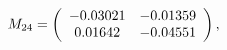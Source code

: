 \begin{equation}
M_{24}=
\left(
\begin{array}{c c}
-0.03021&
-0.01359\\
0.01642&
-0.04551\\
\end{array}
\right),
\end{equation}

